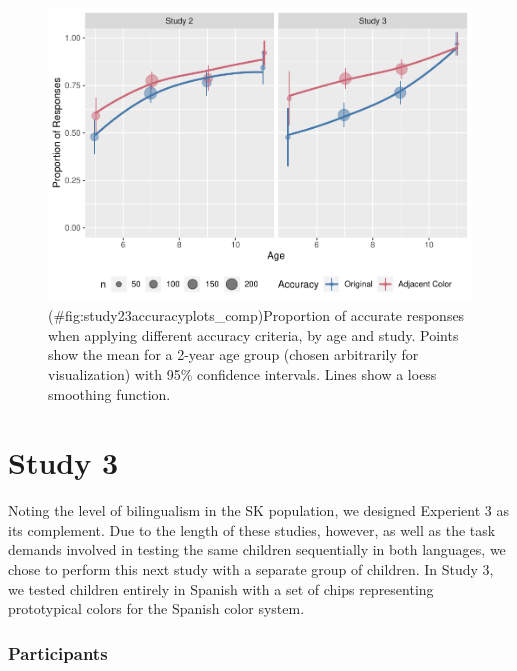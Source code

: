 \documentclass[
  english,
  ,man,floatsintext]{apa6}
\begin{document}
\begin{figure}
\centering
\includegraphics{amazon_color_files/figure-latex/study23accuracyplots_comp-1.pdf}
\caption{(\#fig:study23accuracyplots\_comp)Proportion of accurate responses when applying different accuracy criteria, by age and study. Points show the mean for a 2-year age group (chosen arbitrarily for visualization) with 95\% confidence intervals. Lines show a loess smoothing function.}
\end{figure}

\hypertarget{study-3}{%
\section{Study 3}\label{study-3}}

Noting the level of bilingualism in the SK population, we designed Experient 3 as its complement. Due to the length of these studies, however, as well as the task demands involved in testing the same children sequentially in both languages, we chose to perform this next study with a separate group of children. In Study 3, we tested children entirely in Spanish with a set of chips representing prototypical colors for the Spanish color system.

\hypertarget{participants-2}{%
\subsubsection{Participants}\label{participants-2}}
\end{document}
